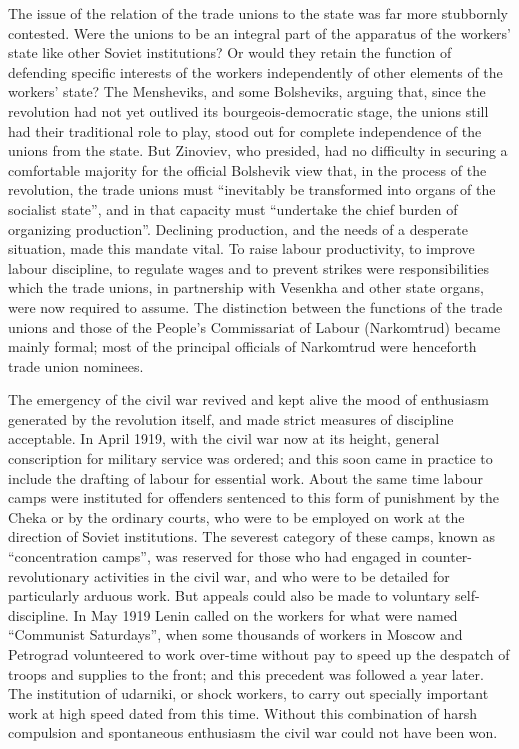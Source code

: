 The issue of the relation of the trade unions to the state was far more stubbornly contested. Were the unions to be an integral part of the apparatus of the workers' state like other Soviet institutions? Or would they retain the function of defending specific interests of the workers independently of other elements of the workers' state? The Mensheviks, and some Bolsheviks, arguing that, since the revolution had not yet outlived its bourgeois-democratic stage, the unions still had their traditional role to play, stood out for complete independence of the unions from the state. But Zinoviev, who presided, had no difficulty in securing a comfortable majority for the official Bolshevik view that, in the process of the revolution, the trade unions must ``inevitably be transformed into organs of the socialist state'', and in that capacity must ``undertake the chief burden of organizing production''. Declining production, and the needs of a desperate situation, made this mandate vital. To raise labour productivity, to improve labour discipline, to regulate wages and to prevent strikes were responsibilities which the trade unions, in partnership with Vesenkha and other state organs, were now required to assume. The distinction between the functions of the trade unions and those of the People's Commissariat of Labour (Narkomtrud) became mainly formal; most of the principal officials of Narkomtrud were henceforth trade union nominees. 

The emergency of the civil war revived and kept alive the mood of enthusiasm generated by the revolution itself, and made strict measures of discipline acceptable. In April 1919, with the civil war now at its height, general conscription for military service was ordered; and this soon came in practice to include the drafting of labour for essential work. About the same time labour camps were instituted for offenders sentenced to this form of punishment by the Cheka or by the ordinary courts, who were to be employed on work at the direction of Soviet institutions. The severest category of these camps, known as ``concentration camps'', was reserved for those who had engaged in counter-revolutionary activities in the civil war, and who were to be detailed for particularly arduous work. But appeals could also be made to voluntary self-discipline. In May 1919 Lenin called on the workers for what were named ``Communist Saturdays'', when some thousands of workers in Moscow and Petrograd volunteered to work over-time without pay to speed up the despatch of troops and supplies to the front; and this precedent was followed a year later. The institution of udarniki, or shock workers, to carry out specially important work at high speed dated from this time. Without this combination of harsh compulsion and spontaneous enthusiasm the civil war could not have been won. 


